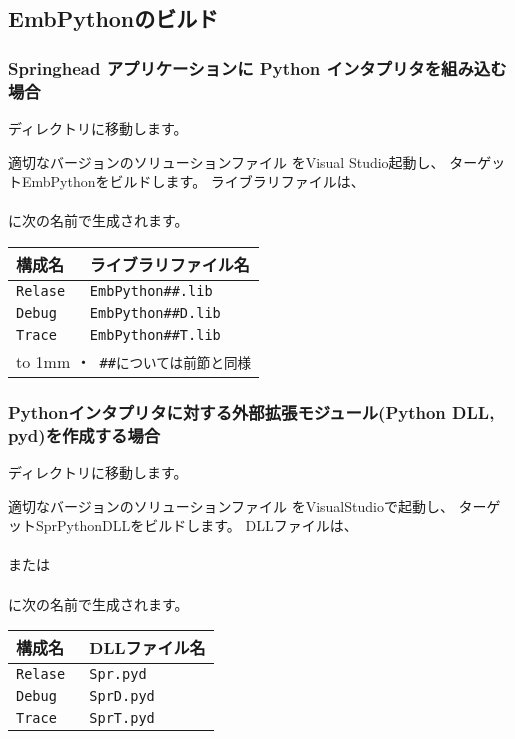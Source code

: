 \subsection{EmbPythonのビルド}
\label{subsec:EmbPython_Build}
\parindent=0pt

\subsubsection{Springhead アプリケーションに Python インタプリタを組み込む場合}

ディレクトリ\SprTop{\core\src\EmbPython}に移動します。
\label{subsubsec:EmbPythonInterpreter}

\medskip
適切なバージョンのソリューションファイル
をVisual Studio起動し、
ターゲットEmbPythonをビルドします。
ライブラリファイルは、\\
\hspace{20pt}\\
に次の名前で生成されます。

\begin{center}
\begin{tabular}{l@{\ \ ---\ \ }l}\hline
	構成名 & ライブラリファイル名 \\\hline
	\tt{Relase} & \tt{EmbPython\#\#.lib}  \\
	\tt{Debug}  & \tt{EmbPython\#\#D.lib} \\
	\tt{Trace}  & \tt{EmbPython\#\#T.lib} \\\hline
	\multicolumn{2}{l}{\footnotesize{\vbox{\vbox to 1mm{}
		\hbox{・ \tt{\#\#}については前節と同様}}}}
\end{tabular}
\end{center}

\bigskip
\subsubsection{Pythonインタプリタに対する外部拡張モジュール(Python DLL, pyd)を作成する場合}
\label{subsubsec:EmbPythonDLL}

\medskip
ディレクトリ\SprTop{\core\embed}に移動します。

適切なバージョンのソリューションファイル
をVisualStudioで起動し、
ターゲットSprPythonDLLをビルドします。
DLLファイルは、\\
\hspace{20pt}\\
または\\
\hspace{20pt}\\
に次の名前で生成されます。

\begin{center}\begin{tabular}{l@{\ \ ---\ \ }l}\hline
	構成名 & DLLファイル名 \\\hline
	\tt{Relase} & \tt{Spr.pyd}  \\
	\tt{Debug}  & \tt{SprD.pyd} \\
	\tt{Trace}  & \tt{SprT.pyd} \\\hline
\end{tabular}\end{center}

\bigskip

